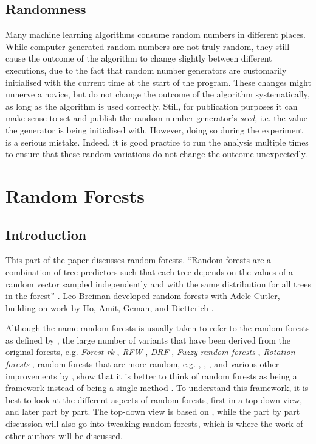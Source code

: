 \documentclass[a4paper,man,12pt,apacite,floatsintext]{apa6} %
\begin{document}
\subsection{Randomness}
Many machine learning algorithms consume random numbers in different places.
While computer generated random numbers are not truly random, they still
cause the outcome of the algorithm to change slightly between different
executions, due to the fact that random number generators are customarily
initialised with the current time at the start of the program.
These changes might unnerve a novice, but do not change the outcome of the
algorithm systematically, as long as the algorithm is used correctly.
Still, for publication purposes it can make sense to set and publish the
random number generator's \emph{seed}, i.e. the value the generator is being
initialised with.
However, doing so during the experiment
is a serious mistake.
Indeed, it is good practice to run the analysis multiple times to ensure
that these random variations do not change the outcome unexpectedly.

\newpage
\section{Random Forests}

\subsection{Introduction}
This part of the paper discusses random forests.
“Random forests are a combination of tree predictors such that each tree
depends on the values of a random vector sampled independently and with
the same distribution for all trees in the forest” \cite{breiman2001random}.
Leo Breiman developed random forests with Adele Cutler, building on work
by Ho, Amit, Geman, and Dietterich \cite{wpRF}.

Although the name random forests is usually taken to refer to the random
forests as defined by , the large number of
variants that have been derived from the original forests, e.g.
\emph{Forest-rk} \cite{bernard2008forest}, \emph{RFW} \cite{maudes2012random},
\emph{DRF} \cite{bernard2012dynamic}, \emph{Fuzzy random forests} \cite{bonissone2008fuzzy},
\emph{Rotation forests} \cite{rodriguez2006rotation}, random forests that are
more random, e.g. , ,
, and various other improvements by
,
show that it
is better to think of random forests as being a framework instead of being
a single method \cite{wpRF}.
To understand this framework, it is best to look at the different aspects
of random forests, first in a top-down view, and later part by part.
The top-down view is based on ,
while the part by part discussion will also go into tweaking random forests,
which is where the work of other authors will be discussed.
\end{document}
